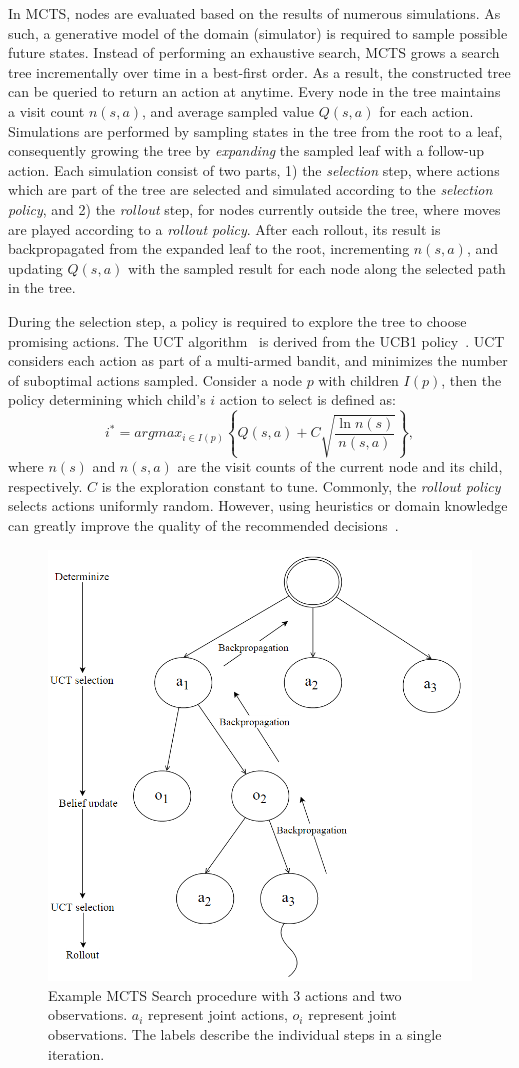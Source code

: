 \documentclass[conference]{IEEEtran}
\begin{document}
In MCTS, nodes are evaluated based on the results of numerous simulations. As such, a generative model of the domain (\ie simulator) is required to sample possible future states. Instead of performing an exhaustive search, MCTS grows a search tree incrementally over time in a best-first order. As a result, the constructed tree can be queried to return an action at anytime. Every node in the tree maintains a visit count $n(s,a)$, and average sampled value $Q(s,a)$ for each action. Simulations are performed by sampling states in the tree from the root to a leaf, consequently growing the tree by \emph{expanding} the sampled leaf with a follow-up action. Each simulation consist of two parts, 1) the \emph{selection} step, where actions which are part of the tree are selected and simulated according to the {\it selection policy}, and 2) the \emph{rollout} step, for nodes currently outside the tree, where moves are played according to a \emph{rollout policy}. After each rollout, its result is backpropagated from the expanded leaf to the root, incrementing $n(s,a)$, and updating $Q(s,a)$ with the sampled result for each node along the selected path in the tree.

During the selection step, a policy is required to explore the tree to choose promising actions. The UCT algorithm~\cite{kocsis2006bandit} is derived from the UCB1 policy~\cite{auer2002using}. UCT considers each action as part of a multi-armed bandit, and minimizes the number of suboptimal actions sampled. Consider a node $p$ with children $I(p)$, then the policy determining which child's $i$ action to select is defined as:
\begin{equation}
\label{eq:uct}
i^* = argmax_{i \in I(p)}\left\{ Q(s,a) + C \sqrt{ \frac{\ln{n(s)}}{n(s, a)}}\right\},
\end{equation}
where $n(s)$ and $n(s, a)$ are the visit counts of the current node and its child, respectively. $C$ is the exploration constant to tune. Commonly, the \emph{rollout policy} selects actions uniformly random. However, using heuristics or domain knowledge can greatly improve the quality of the recommended decisions~\cite{browne2012survey}.

\begin{figure}
\begin{center}
 \includegraphics[width=.44\textwidth]{img/searchtree.png}
 \caption{Example MCTS Search procedure with 3 actions and two observations. $a_i$ represent joint actions, $o_i$ represent joint observations. The labels describe the individual steps in a single iteration.}\label{fig:searchtree}
\end{center}
\end{figure}
\end{document}
